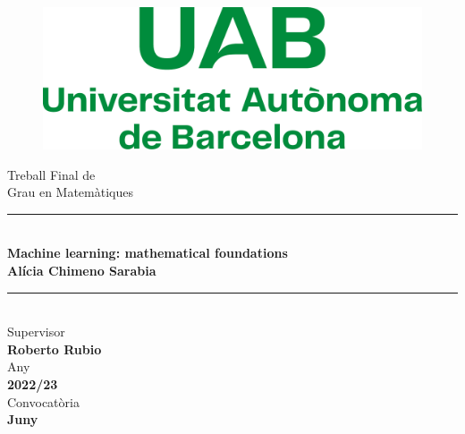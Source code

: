 \documentclass[/main.tex]{subfiles}
\begin{document}
	\begin{center}
	    \begin{figure}
	        \centering
	        \includegraphics[width=0.6\linewidth]{imgs/uab.pdf}
	    \end{figure} \mbox{} \par
		\vspace{1cm}
		{\Huge Treball Final de} \\ \bigskip
		{\LARGE Grau en Matemàtiques} \\
		\vfill
        \noindent\rule{\textwidth}{1pt} \\ \bigskip
		{\Huge \bfseries Machine learning: mathematical foundations} \\
		\vspace{1cm}
		{\LARGE \textbf{Alícia Chimeno Sarabia}} \\ \bigskip %
	    \noindent\rule{\textwidth}{1pt} \\ 
	    \vfill
	    Supervisor \\ \textbf{Roberto Rubio} \\ \medskip
		Any \\ \textbf{2022/23} \\ \medskip
		Convocatòria \\ \textbf{Juny}
	\end{center}
\end{document}
